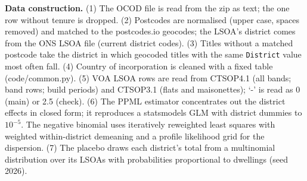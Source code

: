 \documentclass[11pt,a4paper]{article}
\begin{document}
\textbf{Data construction.} (1) The OCOD file is read from the zip as text; the one row without tenure is dropped. (2) Postcodes are normalised (upper case, spaces removed) and matched to the postcodes.io geocodes; the LSOA's district comes from the ONS LSOA file (current district codes). (3) Titles without a matched postcode take the district in which geocoded titles with the same \texttt{District} value most often fall. (4) Country of incorporation is cleaned with a fixed table (code/common.py). (5) VOA LSOA rows are read from CTSOP4.1 (all bands; band rows; build periods) and CTSOP3.1 (flats and maisonettes); `-' is read as 0 (main) or 2.5 (check). (6) The PPML estimator concentrates out the district effects in closed form; it reproduces a statsmodels GLM with district dummies to $10^{-5}$. The negative binomial uses iteratively reweighted least squares with weighted within-district demeaning and a profile likelihood grid for the dispersion. (7) The placebo draws each district's total from a multinomial distribution over its LSOAs with probabilities proportional to dwellings (seed 2026).
\end{document}
